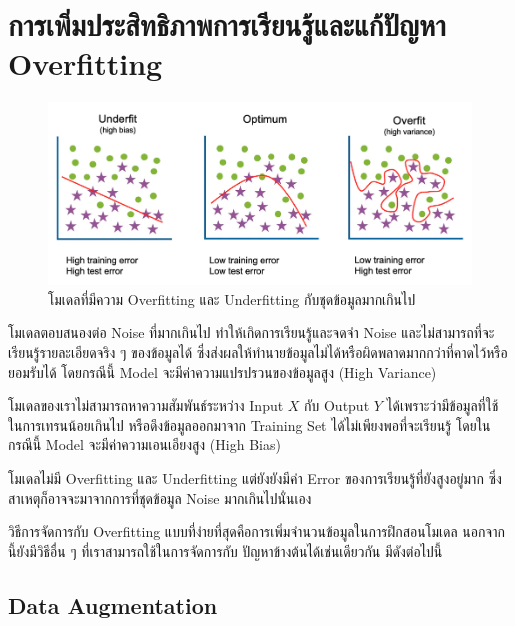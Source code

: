 \section{การเพิ่มประสิทธิภาพการเรียนรู้และแก้ปัญหา Overfitting}

\begin{figure}[H]
    \centering
    \includegraphics[width=0.8\linewidth]{fig/overfitting.png}
    \caption{โมเดลที่มีความ Overfitting และ Underfitting กับชุดข้อมูลมากเกินไป}
    \label{fig:overfitting}
\end{figure}

\begin{description}[style=nextline]
    \item[Overfitting] โมเดลตอบสนองต่อ Noise ที่มากเกินไป ทำให้เกิดการเรียนรู้และจดจำ Noise และไม่สามารถที่จะเรียนรู้รายละเอียดจริง ๆ ของข้อมูลได้
    ซึ่งส่งผลให้ทำนายข้อมูลไม่ได้หรือผิดพลาดมากกว่าที่คาดไว้หรือยอมรับได้ โดยกรณีนี้ Model จะมีค่าความแปรปรวนของข้อมูลสูง (High Variance)
    
    \item[Underfitting] โมเดลของเราไม่สามารถหาความสัมพันธ์ระหว่าง Input $X$ กับ Output $Y$ ได้เพราะว่ามีข้อมูลที่ใช้ในการเทรนน้อยเกินไป
    หรือดึงข้อมูลออกมาจาก Training Set ได้ไม่เพียงพอที่จะเรียนรู้ โดยในกรณีนี้ Model จะมีค่าความเอนเอียงสูง (High Bias)

    \item[Noisy] โมเดลไม่มี Overfitting และ Underfitting แต่ยังยังมีค่า Error ของการเรียนรู้ที่ยังสูงอยู่มาก ซึ่งสาเหตุก็อาจจะมาจากการที่ชุดข้อมูล Noise มากเกินไปนั่นเอง
\end{description}

วิธีการจัดการกับ Overfitting แบบที่ง่ายที่สุดคือการเพิ่มจำนวนข้อมูลในการฝึกสอนโมเดล นอกจากนี้ยังมีวิธีอื่น ๆ ที่เราสามารถใช้ในการจัดการกับ%
ปัญหาข้างต้นได้เช่นเดียวกัน มีดังต่อไปนี้

\subsection{Data Augmentation}

